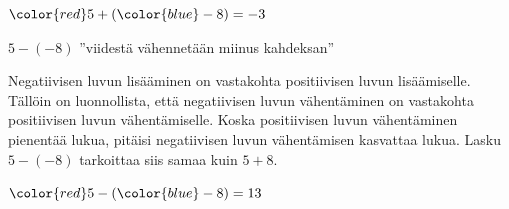     \begin{center}
                 \begin{lukusuora}{-4}{8}{14}
        {\color{blue} }
        \lukusuorauusi
        {\color{red} }
       \end{lukusuora}
       ${\color{red}5}+({\color{blue}-8})=-3$
    \end{center}
    
    
    $5-(-8)$ ''viidestä vähennetään miinus kahdeksan''
    
    Negatiivisen luvun lisääminen on vastakohta positiivisen luvun lisäämiselle. Tällöin on luonnollista, että negatiivisen luvun vähentäminen on vastakohta positiivisen luvun vähentämiselle. Koska positiivisen luvun vähentäminen pienentää lukua, pitäisi negatiivisen luvun vähentämisen kasvattaa lukua. Lasku $5-(-8)$ tarkoittaa siis samaa kuin $5+8$.
    
\vspace{0.3cm}     
        
    \begin{center}
    \begin{lukusuora}{-1}{14}{14}
        {\color{red} }
        \lukusuorauusi
        {\color{red} }
        {\color{blue} }
       \end{lukusuora}
       ${\color{red}5}-({\color{blue}-8})=13$
    \end{center}



%



